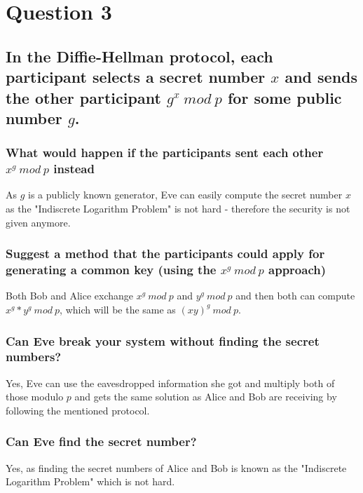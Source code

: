 \documentclass{report}
\begin{document}
	\section{Question 3}
	\startsection
		\renewcommand{\thesubsection}{\thesection.\Alph{subsection}}
		\subsection{In the Diffie-Hellman protocol, each participant selects a secret number $x$ and sends the other participant $g^x \ mod \ p$ for some public number $g$.}
		\startsubsection
			\subsubsection{What would happen if the participants sent each other $x^g \ mod \ p$ instead}
			\startsubsection
				As $g$ is a publicly known generator, Eve can easily compute the secret number $x$ as the "Indiscrete Logarithm Problem" is not hard - therefore the security is not given anymore.
			\closesection
			\subsubsection{Suggest a method that the participants could apply for generating a common key (using the $x^g \ mod \ p$ approach)}
			\startsubsection
				Both Bob and Alice exchange $x^g \ mod \ p$ and $y^g \ mod \ p$ and then both can compute $x^g * y^g \ mod \ p$, which will be the same as $(xy)^g \ mod \ p$.
			\closesection
			\subsubsection{Can Eve break your system without finding the secret numbers?}
			\startsubsection
				Yes, Eve can use the eavesdropped information she got and multiply both of those modulo $p$ and gets the same solution as Alice and Bob are receiving by following the mentioned protocol.
			\closesection
			\subsubsection{Can Eve find the secret number?}
			\startsubsection
				Yes, as finding the secret numbers of Alice and Bob is known as the "Indiscrete Logarithm Problem" which is not hard.
			\closesection
		\closesection
	\closesection
\end{document}
